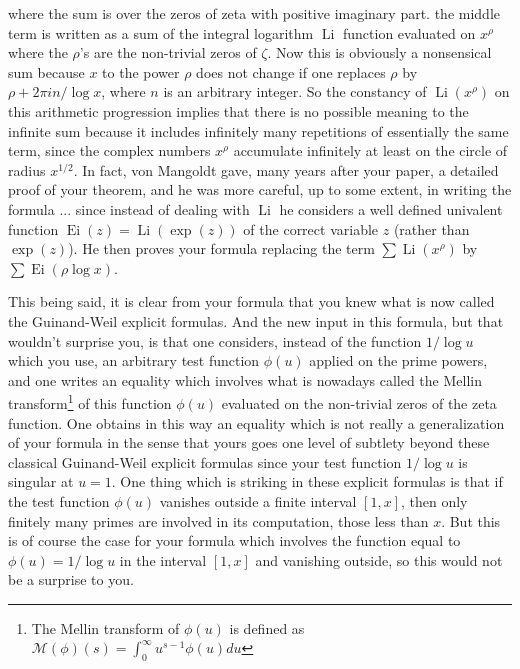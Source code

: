 \documentclass{article}
\begin{document}
\begin{large}
{\begin{equation}
 \end{equation}
where  the sum is over the zeros of zeta with positive imaginary part.} the middle term is written as a sum  of the integral logarithm $\operatorname{Li}$ function evaluated on $x^\rho$ where the $\rho$'s are the non-trivial zeros of $\zeta$.\newline 
Now this is obviously a nonsensical sum because $x$ to the power $\rho$ does not change if one replaces $\rho$ by $\rho + 2 \pi i n /\log x$, where $n$ is an arbitrary integer. So the constancy of $\operatorname{Li}(x^\rho)$ on this arithmetic progression implies that there is no possible meaning to the infinite sum because it includes infinitely many repetitions of essentially the same term, since the complex numbers $x^\rho$ accumulate infinitely at least on the circle of radius $x^{1/2}$. In fact,  von Mangoldt gave, many years after your paper, a detailed proof of your theorem, and he was more careful, up to some extent, in writing the formula ... since instead of dealing with $\operatorname{Li}$  he considers a well defined univalent function $\operatorname{Ei}(z)=\operatorname{Li}(\exp(z))$ of the correct variable  $z$ (rather than $\exp(z)$). He then proves your formula replacing the term $\sum \operatorname{Li}(x^\rho)$ by  $\sum \operatorname{Ei}( \rho \log x)$.  

   
 \medskip
 

  This being said, it is clear from your formula that you knew what is now called the Guinand-Weil explicit formulas. And  the new input  in this formula, but that wouldn't surprise you, is that one considers, instead of the function $1/\log u$ which you use, an arbitrary test function $\phi(u)$ applied on the prime powers, and one writes an equality which involves what is nowadays called the Mellin transform\footnote{The Mellin transform of $\phi(u)$ is defined as $\mathcal{M}(\phi)(s)=\int_0^{\infty} u^{s-1} \phi(u) du$} of this function $\phi(u)$ evaluated on the non-trivial zeros of the zeta function. One obtains in this way an equality which is not really a generalization of your formula in the sense that yours  goes one level of subtlety beyond these classical Guinand-Weil explicit formulas since your test function $1/\log u$ is singular at $u=1$. One thing which is striking in these explicit formulas is that if the test function $\phi(u)$ vanishes outside a finite interval $[1,x]$, then only finitely many primes are involved in its computation, those less  than $x$. But this is of course the case for your formula which involves the function equal to $\phi(u)=1/\log u$ in the interval $[1,x]$ and vanishing outside, so this would not be a surprise to you. 
   

\end{large}
\end{document}
